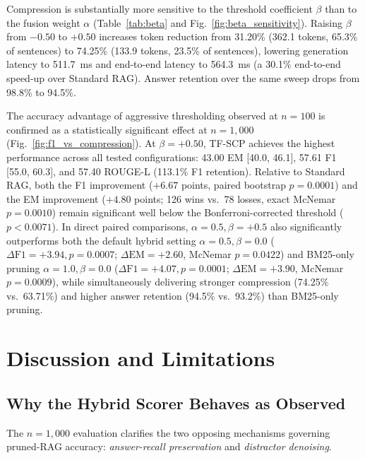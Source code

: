 \documentclass[conference]{IEEEtran}
\begin{document}
Compression is substantially more sensitive to the threshold coefficient $\beta$ than to the fusion weight $\alpha$ (Table~\ref{tab:beta} and Fig.~\ref{fig:beta_sensitivity}). Raising $\beta$ from $-0.50$ to $+0.50$ increases token reduction from 31.20\% (362.1 tokens, 65.3\% of sentences) to 74.25\% (133.9 tokens, 23.5\% of sentences), lowering generation latency to 511.7~ms and end-to-end latency to 564.3~ms (a 30.1\% end-to-end speed-up over Standard RAG). Answer retention over the same sweep drops from 98.8\% to 94.5\%.

The accuracy advantage of aggressive thresholding observed at $n = 100$ is confirmed as a statistically significant effect at $n = 1,000$ (Fig.~\ref{fig:f1_vs_compression}). At $\beta = +0.50$, TF-SCP achieves the highest performance across all tested configurations: 43.00 EM [40.0, 46.1], 57.61 F1 [55.0, 60.3], and 57.40 ROUGE-L (113.1\% F1 retention). Relative to Standard RAG, both the F1 improvement ($+6.67$ points, paired bootstrap $p = 0.0001$) and the EM improvement ($+4.80$ points; 126 wins vs.\ 78 losses, exact McNemar $p = 0.0010$) remain significant well below the Bonferroni-corrected threshold ($p < 0.0071$). In direct paired comparisons, $\alpha = 0.5, \beta = +0.5$ also significantly outperforms both the default hybrid setting $\alpha = 0.5, \beta = 0.0$ ($\Delta\mathrm{F1} = +3.94, p = 0.0007$; $\Delta\mathrm{EM} = +2.60$, McNemar $p = 0.0422$) and BM25-only pruning $\alpha = 1.0, \beta = 0.0$ ($\Delta\mathrm{F1} = +4.07, p = 0.0001$; $\Delta\mathrm{EM} = +3.90$, McNemar $p = 0.0009$), while simultaneously delivering stronger compression (74.25\% vs.\ 63.71\%) and higher answer retention (94.5\% vs.\ 93.2\%) than BM25-only pruning.

\section{Discussion and Limitations}
\label{sec:discussion}

\subsection{Why the Hybrid Scorer Behaves as Observed}
\label{subsec:hybrid_behavior}

The $n = 1,000$ evaluation clarifies the two opposing mechanisms governing pruned-RAG accuracy: \emph{answer-recall preservation} and \emph{distractor denoising}.
\end{document}
